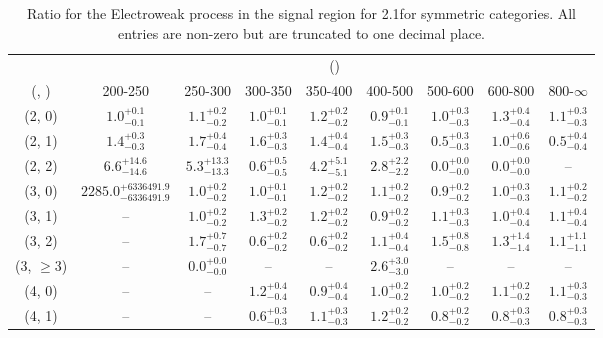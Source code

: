 \begin{table}[h!]
\tiny
\centering
\caption{Ratio for the Electroweak process in the signal region for 2.1\ifb for symmetric categories. All entries are non-zero but are truncated to one decimal place.\label{tab:ratiosep_sig_ewk_sym}}
\begin{tabular}
{ccccccccc}
	\hline\hline
	& \multicolumn{8}{c}{\scalht (\gev)} \\ 
	 (\njet,  \nb) & 200-250 & 250-300 & 300-350 & 350-400 & 400-500 & 500-600 & 600-800 & 800-$\infty$ \\ [0.8ex] 
\hline
	(2, 0) & $1.0^{+ 0.1 }_{- 0.1 }$ & $1.1^{+ 0.2 }_{- 0.2 }$ & $1.0^{+ 0.1 }_{- 0.1 }$ & $1.2^{+ 0.2 }_{- 0.2 }$ & $0.9^{+ 0.1 }_{- 0.1 }$ & $1.0^{+ 0.3 }_{- 0.3 }$ & $1.3^{+ 0.4 }_{- 0.4 }$ & $1.1^{+ 0.3 }_{- 0.3 }$ \\[0.5ex] 
	(2, 1) & $1.4^{+ 0.3 }_{- 0.3 }$ & $1.7^{+ 0.4 }_{- 0.4 }$ & $1.6^{+ 0.3 }_{- 0.3 }$ & $1.4^{+ 0.4 }_{- 0.4 }$ & $1.5^{+ 0.3 }_{- 0.3 }$ & $0.5^{+ 0.3 }_{- 0.3 }$ & $1.0^{+ 0.6 }_{- 0.6 }$ & $0.5^{+ 0.4 }_{- 0.4 }$ \\[0.5ex] 
	(2, 2) & $6.6^{+ 14.6 }_{- 14.6 }$ & $5.3^{+ 13.3 }_{- 13.3 }$ & $0.6^{+ 0.5 }_{- 0.5 }$ & $4.2^{+ 5.1 }_{- 5.1 }$ & $2.8^{+ 2.2 }_{- 2.2 }$ & $0.0^{+ 0.0 }_{- 0.0 }$ & $0.0^{+ 0.0 }_{- 0.0 }$ & -- \\[0.5ex] 
	(3, 0) & $2285.0^{+ 6336491.9 }_{- 6336491.9 }$ & $1.0^{+ 0.2 }_{- 0.2 }$ & $1.0^{+ 0.1 }_{- 0.1 }$ & $1.2^{+ 0.2 }_{- 0.2 }$ & $1.1^{+ 0.2 }_{- 0.2 }$ & $0.9^{+ 0.2 }_{- 0.2 }$ & $1.0^{+ 0.3 }_{- 0.3 }$ & $1.1^{+ 0.2 }_{- 0.2 }$ \\[0.5ex] 
	(3, 1) & -- & $1.0^{+ 0.2 }_{- 0.2 }$ & $1.3^{+ 0.2 }_{- 0.2 }$ & $1.2^{+ 0.2 }_{- 0.2 }$ & $0.9^{+ 0.2 }_{- 0.2 }$ & $1.1^{+ 0.3 }_{- 0.3 }$ & $1.0^{+ 0.4 }_{- 0.4 }$ & $1.1^{+ 0.4 }_{- 0.4 }$ \\[0.5ex] 
	(3, 2) & -- & $1.7^{+ 0.7 }_{- 0.7 }$ & $0.6^{+ 0.2 }_{- 0.2 }$ & $0.6^{+ 0.2 }_{- 0.2 }$ & $1.1^{+ 0.4 }_{- 0.4 }$ & $1.5^{+ 0.8 }_{- 0.8 }$ & $1.3^{+ 1.4 }_{- 1.4 }$ & $1.1^{+ 1.1 }_{- 1.1 }$ \\[0.5ex] 
	(3, $\ge3$) & -- & $0.0^{+ 0.0 }_{- 0.0 }$ & -- & -- & $2.6^{+ 3.0 }_{- 3.0 }$ & -- & -- & -- \\[0.5ex] 
	(4, 0) & -- & -- & $1.2^{+ 0.4 }_{- 0.4 }$ & $0.9^{+ 0.4 }_{- 0.4 }$ & $1.0^{+ 0.2 }_{- 0.2 }$ & $1.0^{+ 0.2 }_{- 0.2 }$ & $1.1^{+ 0.2 }_{- 0.2 }$ & $1.1^{+ 0.3 }_{- 0.3 }$ \\[0.5ex] 
	(4, 1) & -- & -- & $0.6^{+ 0.3 }_{- 0.3 }$ & $1.1^{+ 0.3 }_{- 0.3 }$ & $1.2^{+ 0.2 }_{- 0.2 }$ & $0.8^{+ 0.2 }_{- 0.2 }$ & $0.8^{+ 0.3 }_{- 0.3 }$ & $0.8^{+ 0.3 }_{- 0.3 }$ \\[0.5ex] 

\end{tabular}
\end{table}
